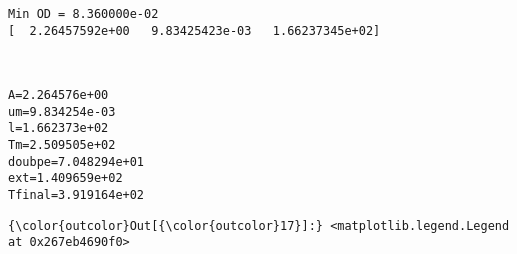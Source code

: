 \documentclass[11pt]{article}
\begin{document}
    \begin{Verbatim}[commandchars=\\\{\}]
Min OD = 8.360000e-02
[  2.26457592e+00   9.83425423e-03   1.66237345e+02]

    \end{Verbatim}

    \begin{center}
    \end{center}
    { \hspace*{\fill} \\}
    
    \begin{Verbatim}[commandchars=\\\{\}]
A=2.264576e+00
um=9.834254e-03
l=1.662373e+02
Tm=2.509505e+02
doubpe=7.048294e+01
ext=1.409659e+02
Tfinal=3.919164e+02

    \end{Verbatim}

            \begin{Verbatim}[commandchars=\\\{\}]
{\color{outcolor}Out[{\color{outcolor}17}]:} <matplotlib.legend.Legend at 0x267eb4690f0>
\end{Verbatim}
        
    \begin{center}
    \end{center}
    { \hspace*{\fill} \\}
    
    \begin{center}
    \end{center}
    { \hspace*{\fill} \\}
    
\end{document}
